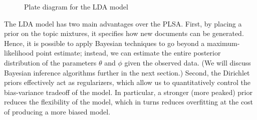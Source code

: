 \documentclass{article}
\begin{document}
\begin{figure}[htb]
%
\centering
{}
%
\caption{Plate diagram for the LDA model}
\label{fig:plate-lda}
\end{figure}

The LDA model has two main advantages over the PLSA.
First, by placing a prior on the topic mixtures, it specifies how new documents can be generated.
Hence, it is possible to apply Bayesian techniques to go beyond a maximum-likelihood point estimate; instead, we can estimate the entire posterior distribution of the parameters $\theta$ and $\phi$ given the observed data.
(We will discuss Bayesian inference algorithms further in the next section.)
Second, the Dirichlet priors effectively act as regularizers, which allow us to quantitatively control the bias-variance tradeoff of the model.
In particular, a stronger (more peaked) prior reduces the flexibility of the model, which in turns reduces overfitting at the cost of producing a more biased model.
\end{document}
